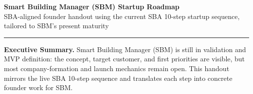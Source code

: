 \documentclass[10pt]{article}
\begin{document}
\footnotesize

{\Huge\bfseries Smart Building Manager (SBM) Startup Roadmap}\\[-1pt]
{\large SBA-aligned founder handout using the current SBA 10-step startup sequence, tailored to SBM's present maturity}

\vspace{4pt}
{\color{SBMBlue}\rule{\textwidth}{1.2pt}}

\textbf{Executive Summary.} Smart Building Manager (SBM) is still in validation and MVP definition: the concept, target customer, and first priorities are visible, but most company-formation and launch mechanics remain open. This handout mirrors the live SBA 10-step sequence and translates each step into concrete founder work for SBM.

\vspace{2pt}
\setlength{\tabcolsep}{3pt}
\scriptsize
\end{document}
